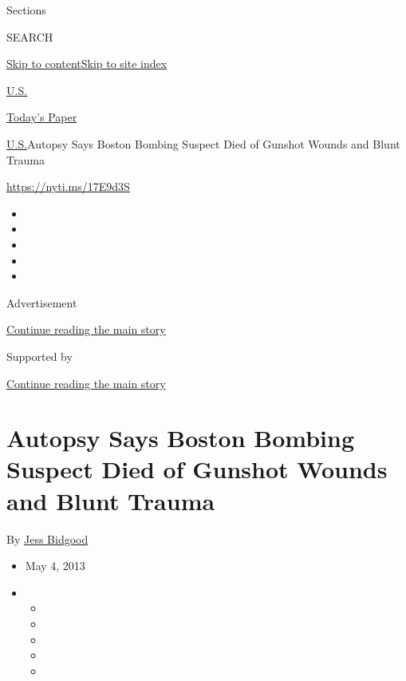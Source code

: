 Sections

SEARCH

\protect\hyperlink{site-content}{Skip to
content}\protect\hyperlink{site-index}{Skip to site index}

\href{https://www.nytimes.com/section/us}{U.S.}

\href{https://myaccount.nytimes.com/auth/login?response_type=cookie\&client_id=vi}{}

\href{https://www.nytimes.com/section/todayspaper}{Today's Paper}

\href{/section/us}{U.S.}\textbar{}Autopsy Says Boston Bombing Suspect
Died of Gunshot Wounds and Blunt Trauma

\url{https://nyti.ms/17E9d3S}

\begin{itemize}
\item
\item
\item
\item
\item
\end{itemize}

Advertisement

\protect\hyperlink{after-top}{Continue reading the main story}

Supported by

\protect\hyperlink{after-sponsor}{Continue reading the main story}

\hypertarget{autopsy-says-boston-bombing-suspect-died-of-gunshot-wounds-and-blunt-trauma}{%
\section{Autopsy Says Boston Bombing Suspect Died of Gunshot Wounds and
Blunt
Trauma}\label{autopsy-says-boston-bombing-suspect-died-of-gunshot-wounds-and-blunt-trauma}}

By \href{https://www.nytimes.com/by/jess-bidgood}{Jess Bidgood}

\begin{itemize}
\item
  May 4, 2013
\item
  \begin{itemize}
  \item
  \item
  \item
  \item
  \item
  \end{itemize}
\end{itemize}

